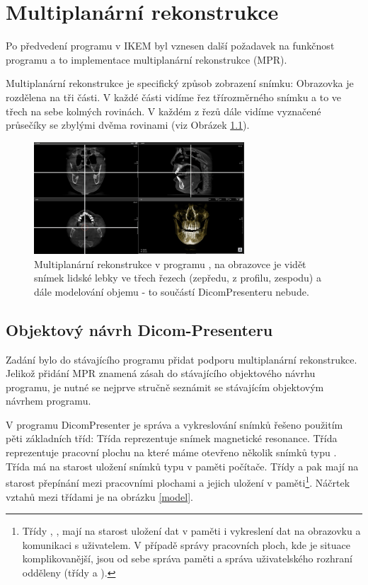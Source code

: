 \newpage
\chapter{Multiplanární rekonstrukce}
Po předvedení programu v IKEM byl vznesen další požadavek na funkčnost programu a to implementace multiplanární rekonstrukce (MPR).

Multiplanární rekonstrukce je specifický způsob zobrazení snímku: Obrazovka je rozdělena na tři části. V každé části vidíme řez třírozměrného snímku a to ve třech na sebe kolmých rovinách. V každém z řezů dále vidíme vyznačené průsečíky se zbylými dvěma rovinami (viz Obrázek \ref{MPR}).

\begin{figure}
	\caption{Multiplanární rekonstrukce v programu \cite{volux}, na obrazovce je vidět snímek lidské lebky ve třech řezech (zepředu, z profilu, zespodu) a dále modelování objemu - to součástí DicomPresenteru nebude.}
	\begin{center}
	\includegraphics[width=0.7\textwidth]{Text/IMG/MPR.jpg}
	\end{center}
	\label{MPR}
\end{figure}

\section{Objektový návrh Dicom-Presenteru}
Zadání bylo do stávajícího programu přidat podporu multiplanární rekonstrukce. Jelikož přidání MPR znamená zásah do stávajícího objektového návrhu programu, je nutné se nejprve stručně seznámit se stávajícím objektovým návrhem programu.

V programu DicomPresenter je správa a vykreslování snímků řešeno použitím pěti základních tříd: Třída  reprezentuje snímek magnetické resonance. Třída  reprezentuje pracovní plochu na které máme otevřeno několik snímků typu . Třída  má na starost uložení snímků typu  v paměti počítače. Třídy  a  pak mají na starost přepínání mezi pracovními plochami a jejich uložení v paměti\footnote{Třídy , ,  mají na starost uložení dat v paměti i vykreslení dat na obrazovku a komunikaci s uživatelem. V případě správy pracovních ploch, kde je situace komplikovanější, jsou od sebe správa paměti a správa uživatelského rozhraní odděleny (třídy  a ). }. Náčrtek vztahů mezi třídami je na obrázku \ref{model}.

